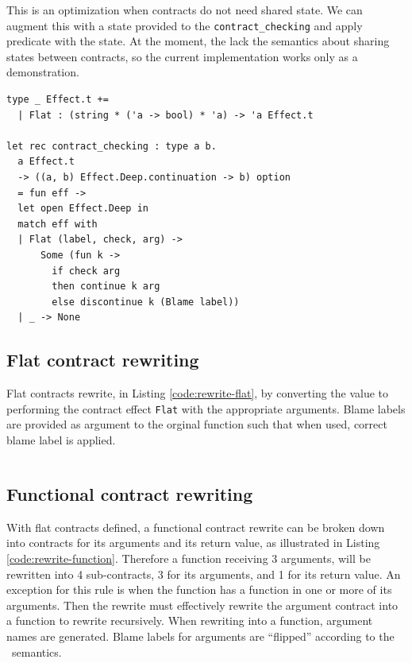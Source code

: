 This is an optimization when contracts do not need shared state. We can augment
this with a state provided to the \texttt{contract\_checking} and apply
predicate with the state. At the moment, the lack the semantics about sharing
states between contracts, so the current implementation works only as a
demonstration.

\begin{listing}
\begin{verbatim}
type _ Effect.t +=
  | Flat : (string * ('a -> bool) * 'a) -> 'a Effect.t

let rec contract_checking : type a b.
  a Effect.t
  -> ((a, b) Effect.Deep.continuation -> b) option
  = fun eff ->
  let open Effect.Deep in
  match eff with
  | Flat (label, check, arg) ->
      Some (fun k ->
        if check arg
        then continue k arg
        else discontinue k (Blame label))
  | _ -> None
\end{verbatim}
\caption{Contract Effect}
\label{code:contract_effect}
\end{listing}

\subsection{Flat contract rewriting}

Flat contracts rewrite, in Listing \ref{code:rewrite-flat}, by converting the value to performing the contract effect \texttt{Flat} with the appropriate arguments. Blame labels are provided as argument to the orginal function such that when used, correct blame label is applied.

\begin{listing}
\inputminted{ocaml}{code/rewrite-flat.ml}
\caption{Flat contract rewrite}
\label{code:rewrite-flat}
\end{listing}

\subsection{Functional contract rewriting}

With flat contracts defined, a functional contract rewrite can be broken down
into contracts for its arguments and its return value, as illustrated in
Listing \ref{code:rewrite-function}. Therefore a function receiving 3
arguments, will be rewritten into 4 sub-contracts, 3 for its arguments, and 1
for its return value. An exception for this rule is when the function has a
function in one or more of its arguments. Then the rewrite must effectively
rewrite the argument contract into a function to rewrite recursively. When
rewriting into a function, argument names are generated. Blame labels for
arguments are ``flipped'' according to the \langc\ semantics.

